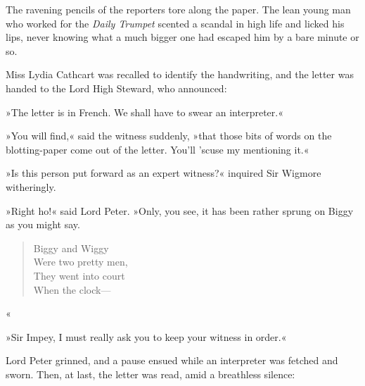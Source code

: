 The ravening pencils of the reporters tore along the paper. The lean
young man who worked for the \textit{Daily Trumpet} scented a scandal in high
life and licked his lips, never knowing what a much bigger one had
escaped him by a bare minute or so.

Miss Lydia Cathcart was recalled to identify the handwriting, and the
letter was handed to the Lord High Steward, who announced:

»The letter is in French. We shall have to swear an interpreter.«

»You will find,« said the witness suddenly, »that those bits of
words on the blotting-paper come out of the letter. You'll 'scuse my
mentioning it.«

»Is this person put forward as an expert witness?« inquired Sir Wigmore
witheringly.

»Right ho!« said Lord Peter. »Only, you see, it has been rather sprung
on Biggy as you might say.

\begin{verse}
Biggy and Wiggy\\
Were two pretty men,\\
They went into court\\
When the clock---\\
\end{verse}
«

»Sir Impey, I must really ask you to keep your witness in order.«

Lord Peter grinned, and a pause ensued while an interpreter was fetched
and sworn. Then, at last, the letter was read, amid a breathless
silence:

